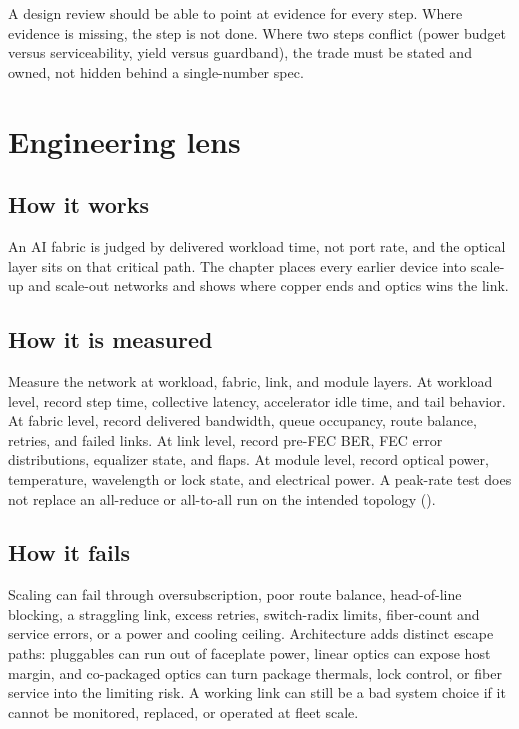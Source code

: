 A design review should be able to point at evidence for every step. Where evidence
is missing, the step is not done. Where two steps conflict (power budget versus
serviceability, yield versus guardband), the trade must be stated and owned, not
hidden behind a single-number spec.

\section{Engineering lens}
\label{sec:networking-engineering-lens}

\subsection{How it works}

An AI fabric is judged by delivered workload time, not port rate, and the optical
layer sits on that critical path. The chapter places every earlier device into
scale-up and scale-out networks and shows where copper ends and optics wins the
link.

\subsection{How it is measured}
\label{sec:networking-how-measured}

Measure the network at workload, fabric, link, and module layers. At workload
level, record step time, collective latency, accelerator idle time, and tail
behavior. At fabric level, record delivered bandwidth, queue occupancy, route
balance, retries, and failed links. At link level, record pre-FEC BER, FEC error
distributions, equalizer state, and flaps. At module level, record optical power,
temperature, wavelength or lock state, and electrical power. A peak-rate test does
not replace an all-reduce or all-to-all run on the intended topology
().

\subsection{How it fails}
\label{sec:networking-how-fails}

Scaling can fail through oversubscription, poor route balance, head-of-line
blocking, a straggling link, excess retries, switch-radix limits, fiber-count and
service errors, or a power and cooling ceiling. Architecture adds distinct escape
paths: pluggables can run out of faceplate power, linear optics can expose host
margin, and co-packaged optics can turn package thermals, lock control, or fiber
service into the limiting risk. A working link can still be a bad system choice if
it cannot be monitored, replaced, or operated at fleet scale.

